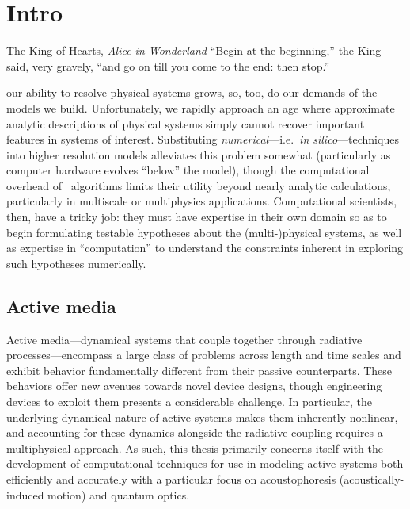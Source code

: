 \chapter{\label{ch:intro}Intro}

\begin{frontquote}{The King of Hearts, \emph{Alice in Wonderland}}
``Begin at the beginning,'' the King said, very gravely, ``and go on till you come to the end: then stop.''
\end{frontquote}

 our ability to resolve physical systems grows, so, too, do our demands of the models we build.
Unfortunately, we rapidly approach an age where approximate analytic descriptions of physical systems simply cannot recover important features in systems of interest.
Substituting \emph{numerical}---i.e.\ \emph{in silico}---techniques into higher resolution models alleviates this problem somewhat (particularly as computer hardware evolves ``below'' the model), though the computational overhead of \naive\ algorithms limits their utility beyond nearly analytic calculations, particularly in multiscale or multiphysics applications.
Computational scientists, then, have a tricky job: they must have expertise in their own domain so as to begin formulating testable hypotheses about the (multi-)physical systems, as well as expertise in ``computation'' to understand the constraints inherent in exploring such hypotheses numerically.

\section{Active media}

Active media---dynamical systems that couple together through radiative processes---encompass a large class of problems across length and time scales and exhibit behavior fundamentally different from their passive counterparts.
These behaviors offer new avenues towards novel device designs, though engineering devices to exploit them presents a considerable challenge.
In particular, the underlying dynamical nature of active systems makes them inherently nonlinear, and accounting for these dynamics alongside the radiative coupling requires a multiphysical approach.
As such, this thesis primarily concerns itself with the development of computational techniques for use in modeling active systems both efficiently and accurately with a particular focus on acoustophoresis (acoustically-induced motion) and quantum optics.

